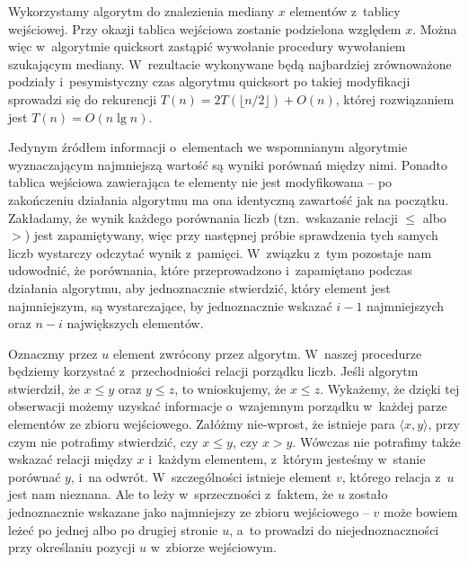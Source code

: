 \exercise %

\noindent Wykorzystamy algorytm  do znalezienia mediany $x$ elementów z~tablicy wejściowej. Przy okazji tablica wejściowa zostanie podzielona względem $x$. Można więc w~algorytmie quicksort zastąpić wywołanie procedury  wywołaniem  szukającym mediany. W~rezultacie wykonywane będą najbardziej zrównoważone podziały i~pesymistyczny czas algorytmu quicksort po takiej modyfikacji sprowadzi się do rekurencji $T(n)=2T(\lfloor n/2\rfloor)+O(n)$, której rozwiązaniem jest $T(n)=O(n\lg n)$.

\exercise %
Jedynym źródłem informacji o~elementach we wspomnianym algorytmie wyznaczającym  najmniejszą wartość są wyniki porównań między nimi. Ponadto tablica wejściowa zawierająca te elementy nie jest modyfikowana -- po zakończeniu działania algorytmu ma ona identyczną zawartość jak na początku. Zakładamy, że wynik każdego porównania liczb (tzn.\ wskazanie relacji $\le$ albo $>$) jest zapamiętywany, więc przy następnej próbie sprawdzenia tych samych liczb wystarczy odczytać wynik z~pamięci. W~związku z~tym pozostaje nam udowodnić, że porównania, które przeprowadzono i~zapamiętano podczas działania algorytmu, aby jednoznacznie stwierdzić, który element jest  najmniejszym, są wystarczające, by jednoznacznie wskazać $i-1$ najmniejszych oraz $n-i$ największych elementów.

Oznaczmy przez $u$ element zwrócony przez algorytm. W~naszej procedurze będziemy korzystać z~przechodniości relacji porządku liczb. Jeśli algorytm stwierdził, że $x\le y$ oraz $y\le z$, to wnioskujemy, że $x\le z$. Wykażemy, że dzięki tej obserwacji możemy uzyskać informacje o~wzajemnym porządku w~każdej parze elementów ze zbioru wejściowego. Załóżmy nie-wprost, że istnieje para $\langle x,y\rangle$, przy czym nie potrafimy stwierdzić, czy $x\le y$, czy $x>y$. Wówczas nie potrafimy także wskazać relacji między $x$ i~każdym elementem, z~którym jesteśmy w~stanie porównać $y$, i~na odwrót. W~szczególności istnieje element $v$, którego relacja z~$u$ jest nam nieznana. Ale to leży w~sprzeczności z~faktem, że $u$ zostało jednoznacznie wskazane jako  najmniejszy ze zbioru wejściowego -- $v$ może bowiem leżeć po jednej albo po drugiej stronie $u$, a~to prowadzi do niejednoznaczności przy określaniu pozycji $u$ w~zbiorze wejściowym.


